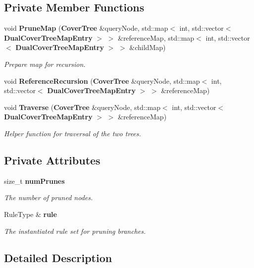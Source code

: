 \subsection*{Private Member Functions}
\begin{DoxyCompactItemize}
\item 
void {\bf Prune\-Map} ({\bf Cover\-Tree} \&query\-Node, std\-::map$<$ int, std\-::vector$<$ {\bf Dual\-Cover\-Tree\-Map\-Entry} $>$ $>$ \&reference\-Map, std\-::map$<$ int, std\-::vector$<$ {\bf Dual\-Cover\-Tree\-Map\-Entry} $>$ $>$ \&child\-Map)
\begin{DoxyCompactList}\small\item\em Prepare map for recursion. \end{DoxyCompactList}\item 
void {\bf Reference\-Recursion} ({\bf Cover\-Tree} \&query\-Node, std\-::map$<$ int, std\-::vector$<$ {\bf Dual\-Cover\-Tree\-Map\-Entry} $>$ $>$ \&reference\-Map)
\item 
void {\bf Traverse} ({\bf Cover\-Tree} \&query\-Node, std\-::map$<$ int, std\-::vector$<$ {\bf Dual\-Cover\-Tree\-Map\-Entry} $>$ $>$ \&reference\-Map)
\begin{DoxyCompactList}\small\item\em Helper function for traversal of the two trees. \end{DoxyCompactList}\end{DoxyCompactItemize}
\subsection*{Private Attributes}
\begin{DoxyCompactItemize}
\item 
size\-\_\-t {\bf num\-Prunes}
\begin{DoxyCompactList}\small\item\em The number of pruned nodes. \end{DoxyCompactList}\item 
Rule\-Type \& {\bf rule}
\begin{DoxyCompactList}\small\item\em The instantiated rule set for pruning branches. \end{DoxyCompactList}\end{DoxyCompactItemize}


\subsection{Detailed Description}
